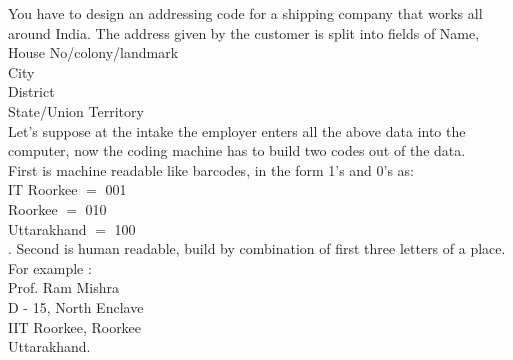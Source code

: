 \documentclass[11pt]{article}
\begin{document}
\bigskip
You have to design an addressing code for a shipping company that works all around India. The address given by the customer is split into fields of 
Name, House No/colony/landmark\\
City\\
District\\
State/Union Territory\\
Let's suppose at the intake the employer enters all the above data into the computer, now the coding machine has to build two codes out of the data.\\

First is machine readable like barcodes, in the form 1’s and 0’s as:\\
IT Roorkee  $=$ 001\\
Roorkee $=$ 010\\
Uttarakhand $=$ 100\\
.
Second is human readable, build by combination of first three letters of a place.\\
For example :\\
Prof. Ram Mishra\\
D - 15, North Enclave\\
IIT Roorkee, Roorkee\\
Uttarakhand.\\
\end{document}
